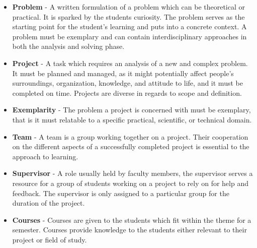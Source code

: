 \begin{itemize}
	\item \textbf{Problem} - A written formulation of a problem which can be theoretical or practical. It is sparked by the students curiosity. The problem serves as the starting point for the student's learning and puts into a concrete context. A problem must be exemplary and can contain interdisciplinary approaches	in both the analysis and solving phase.
	\item \textbf{Project} - A task which requires an analysis of a new and complex problem. It must be planned and managed, as it might potentially affect people's surroundings, organization, knowledge, and attitude to life, and it must be completed on time. Projects are diverse in regards to scope and definition.
	\item \textbf{Exemplarity} - The problem a project is concerned with must be exemplary, that is it must relatable to a specific practical, scientific, or technical domain.
	\item \textbf{Team} - A team is a group working together on a project. Their cooperation on the different aspects of a successfully completed project is essential to the approach to learning.
	\item \textbf{Supervisor} - A role usually held by faculty members, the supervisor serves a resource for a group of students working on a project to rely on for help and feedback. The supervisor is only assigned to a particular group for the duration of the project. 
	\item \textbf{Courses} - Courses are given to the students which fit within the theme for a semester. Courses provide knowledge to the students either relevant to their project or field of study.
\end{itemize}

